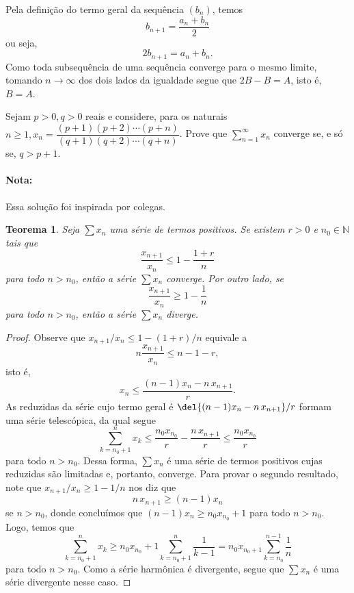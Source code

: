 \documentclass{IMTexam}
\newtheorem{theorem}{Teorema}[question]
\begin{document}
\begin{questions}
\begin{parts}
            \begin{solution}
                Pela definição do termo geral da sequência $(b_n)$, temos
                \[ b_{n+1}=\dfrac{a_{n}+b_n}{2} \]
                ou seja,
                \[ 2b_{n+1}=a_{n}+b_n. \]
                Como toda subsequência de uma sequência converge para o mesmo
                limite, tomando $n\to\infty$ dos dois lados da igualdade
                segue que $2B-B=A$, isto é, $B=A$.
            \end{solution}

        \end{parts}

        \question Sejam $p>0, q>0$ reais e considere, para os naturais
        $n\geqslant
        1,x_n=\dfrac{(p+1)(p+2)\cdots(p+n)}{(q+1)(q+2)\cdots(q+n)}$. Prove que
        $\sum_{n=1}^\infty x_n$ converge se, e só se, $q>p+1$.

        \begin{solution}
            \paragraph{Nota:} Essa solução foi inspirada por colegas.

            \begin{theorem}\label{thm:divConv}
                Seja $\sum x_n$ uma série de termos positivos. Se existem $r>0$ e $n_0\in\mathbb{N}$ tais que
                \[ \dfrac{x_{n+1}}{x_n}\leqslant 1-\dfrac{1+r}{n} \]
                para todo $n>n_0$, então a série $\sum x_n$ converge. Por outro lado, se
                \[ \dfrac{x_{n+1}}{x_n}\geqslant 1-\dfrac{1}{n} \]
                para todo $n>n_0$, então a série $\sum x_n$ diverge.
            \end{theorem}
            \begin{proof}
                Observe que $x_{n+1}/x_n\leqslant 1-(1+r)/n$ equivale a
                \[ n\dfrac{x_{n+1}}{x_n}\leqslant n-1-r, \]
                isto é,
                \[ x_n\leqslant\dfrac{(n-1)x_n-n\,x_{n+1}}{r}. \]
                As reduzidas da série cujo termo geral é
                $\del{(n-1)x_n-n\,x_{n+1}}/r$ formam uma série telescópica, da qual segue
                \[ \sum_{k=n_0+1}^n x_k\leqslant
                \dfrac{n_0x_{n_0}}{r}-\dfrac{n\,x_{n+1}}{r}\leqslant
                \dfrac{n_0x_{n_0}}{r} \]
                para todo $n>n_0$. Dessa forma, $\sum x_n$ é uma série de
                termos positivos cujas reduzidas são limitadas e, portanto,
                converge. Para provar o segundo resultado, note que
                $x_{n+1}/x_n\geqslant 1-1/n$ nos diz que
                \[ n\,x_{n+1}\geqslant (n-1)x_n \]
                se $n > n_0$, donde concluímos que $(n-1)x_n\geqslant
                n_0x_{n_0}+1$ para todo $n>n_0$. Logo, temos que
                \[ \sum_{k=n_0+1}^n x_k\geqslant
                n_0x_{n_0}+1\sum_{k=n_0+1}^n\dfrac{1}{k-1}=n_0x_{n_0+1}\sum_{k=n_0}^{n-1}\dfrac{1}{n}
                \]
                para todo $n>n_0$. Como a série harmônica é divergente, segue
                que $\sum x_n$ é uma série divergente nesse caso.
            \end{proof}


\end{solution}
\end{questions}
\end{document}
